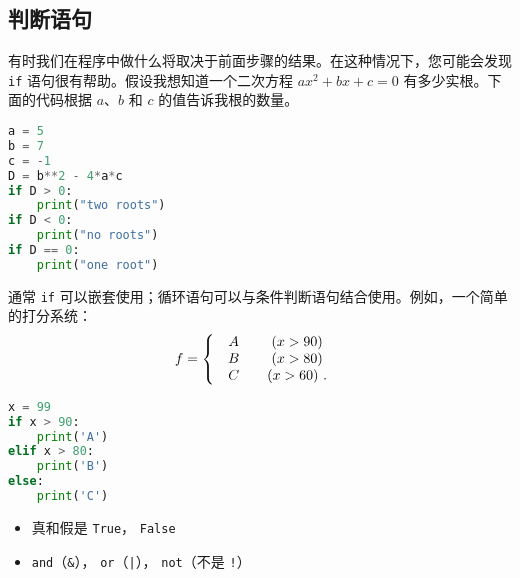 
\begin{issues}
\end{issues}


\subsection{判断语句}
有时我们在程序中做什么将取决于前面步骤的结果。在这种情况下，您可能会发现 \verb`if` 语句很有帮助。假设我想知道一个二次方程 $ax^2+bx+c=0$ 有多少实根。下面的代码根据 $a$、$b$ 和 $c$ 的值告诉我根的数量。
\begin{lstlisting}[language=python]
a = 5
b = 7
c = -1 
D = b**2 - 4*a*c
if D > 0:
    print("two roots")
if D < 0:
    print("no roots")
if D == 0:
    print("one root")
\end{lstlisting}

通常 \verb`if` 可以嵌套使用；循环语句可以与条件判断语句结合使用。例如，一个简单的打分系统：
\begin{equation}
f=\left\{\begin{array}{lc}\begin{array}{c}A\\B \\C \end{array}&\begin{array}{c}
(x>90) \\
(x>80) \\
(x>60)~.\end{array}\end{array}\right.\\\\
\end{equation}
\begin{lstlisting}[language=python]
x = 99
if x > 90:
    print('A')
elif x > 80:
    print('B')
else:
    print('C')
\end{lstlisting}


\begin{itemize}
\item 真和假是 \verb`True`， \verb`False`
\item \verb`and`（\verb`&`）， \verb`or`（\verb`|`）， \verb`not`（不是 \verb`!`）
\end{itemize}


